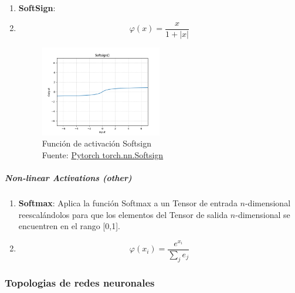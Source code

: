 \begin{enumerate}
    \item \textbf{SoftSign}:
    \item[] \begin{equation} \varphi(x) = \frac{x}{1+\lvert x \rvert} \end{equation}
        \begin{figure}[H]
            \centering
            \includegraphics[width=0.5\textwidth]{figures/equations/Softsign.png}
            \caption{Función de activación Softsign\\Fuente: \href{https://pytorch.org/docs/stable/generated/torch.nn.Softsign.html}{Pytorch torch.nn.Softsign}}
            \label{fig:torch.nn.Softsign}
        \end{figure}
\end{enumerate}

\subparagraph{\textit{Non-linear Activations (other)} \cite{pytorch2024github}}

\begin{enumerate}
    \item \textbf{Softmax}: Aplica la función Softmax a un Tensor de entrada $n$-dimensional reescalándolos para que los elementos del Tensor de salida $n$-dimensional se encuentren en el rango [0,1]. \cite{pytorch2024github}
    \item[] \begin{equation} \varphi(x_{i}) = \frac{e^{x_{i}}}{\sum_{j}{e_{j}}} \end{equation}
\end{enumerate}





\subsubsection{Topologias de redes neuronales}

